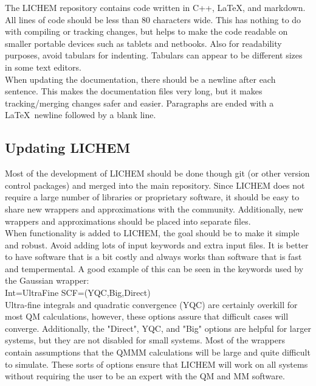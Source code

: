 \documentclass[12pt]{report}
\begin{document}
The LICHEM repository contains code written in C++, \LaTeX, and markdown.
All lines of code should be less than 80 characters wide.
This has nothing to do with compiling or tracking changes, but helps to make
the code readable on smaller portable devices such as tablets and netbooks.
Also for readability purposes, avoid tabulars for indenting.
Tabulars can appear to be different sizes in some text editors. \\

When updating the documentation, there should be a newline after each
sentence.
This makes the documentation files very long, but it makes tracking/merging
changes safer and easier.
Paragraphs are ended with a \LaTeX\ newline followed by a blank line.

\subsection{Updating LICHEM}

Most of the development of LICHEM should be done though git (or other version
control packages) and merged into the main repository.
Since LICHEM does not require a large number of libraries or proprietary
software, it should be easy to share new wrappers and approximations with the
community.
Additionally, new wrappers and approximations should be placed into separate
files. \\

When functionality is added to LICHEM, the goal should be to make it simple
and robust.
Avoid adding lots of input keywords and extra input files.
It is better to have software that is a bit costly and always works than
software that is fast and tempermental.
A good example of this can be seen in the keywords used by the Gaussian
wrapper: \\

Int=UltraFine SCF=(YQC,Big,Direct) \\

Ultra-fine integrals and quadratic convergence (YQC) are certainly overkill
for most QM calculations, however, these options assure that difficult cases
will converge.
Additionally, the "Direct", YQC, and "Big" options are helpful for
larger systems, but they are not disabled for small systems.
Most of the wrappers contain assumptions that the QMMM calculations will be
large and quite difficult to simulate.
These sorts of options ensure that LICHEM will work on all systems without
requiring the user to be an expert with the QM and MM software. \\
\end{document}
